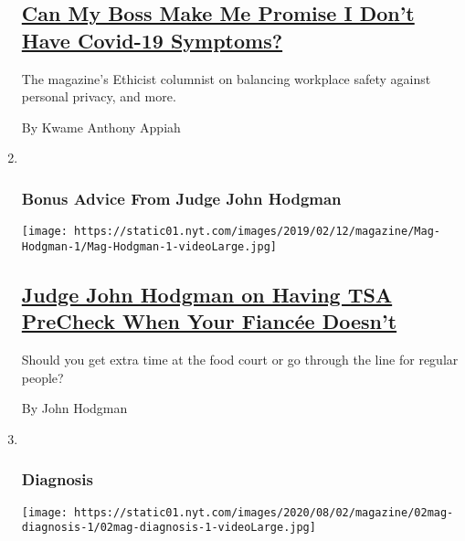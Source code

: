 \begin{enumerate}
  \hypertarget{can-my-boss-make-me-promise-i-dont-have-covid-19-symptoms}{%
  \subsection{\texorpdfstring{\href{/2020/07/28/magazine/can-my-boss-make-me-promise-i-dont-have-covid-19-symptoms.html}{Can
  My Boss Make Me Promise I Don't Have Covid-19
  Symptoms?}}{Can My Boss Make Me Promise I Don't Have Covid-19 Symptoms?}}\label{can-my-boss-make-me-promise-i-dont-have-covid-19-symptoms}}

  The magazine's Ethicist columnist on balancing workplace safety
  against personal privacy, and more.

  By Kwame Anthony Appiah
\item ~
  \hypertarget{bonus-advice-from-judge-john-hodgman}{%
  \subsubsection{Bonus Advice From Judge John
  Hodgman}\label{bonus-advice-from-judge-john-hodgman}}

  \texttt{[image: https://static01.nyt.com/images/2019/02/12/magazine/Mag-Hodgman-1/Mag-Hodgman-1-videoLarge.jpg]}

  \hypertarget{judge-john-hodgman-on-having-tsa-precheck-when-your-fiancuxe9e-doesnt}{%
  \subsection{\texorpdfstring{\href{/2020/07/30/magazine/judge-john-hodgman-on-having-tsa-precheck-when-your-fiancee-doesnt.html}{Judge
  John Hodgman on Having TSA PreCheck When Your Fiancée
  Doesn't}}{Judge John Hodgman on Having TSA PreCheck When Your Fiancée Doesn't}}\label{judge-john-hodgman-on-having-tsa-precheck-when-your-fiancuxe9e-doesnt}}

  Should you get extra time at the food court or go through the line for
  regular people?

  By John Hodgman
\item ~
  \hypertarget{diagnosis}{%
  \subsubsection{Diagnosis}\label{diagnosis}}

  \texttt{[image: https://static01.nyt.com/images/2020/08/02/magazine/02mag-diagnosis-1/02mag-diagnosis-1-videoLarge.jpg]}


\end{enumerate}
